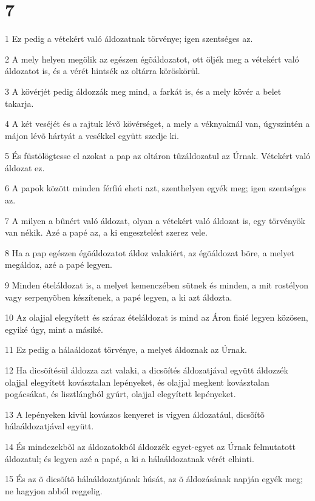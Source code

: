 \chapter{7}

\par 1 Ez pedig a vétekért való áldozatnak törvénye; igen szentséges az.
\par 2 A mely helyen megölik az egészen égõáldozatot, ott öljék meg a vétekért való áldozatot is, és a vérét hintsék az oltárra köröskörül.
\par 3 A kövérjét pedig áldozzák meg mind, a farkát is, és a mely kövér a belet takarja.
\par 4 A két veséjét és a rajtuk lévõ kövérséget, a mely a véknyaknál van, úgyszintén a májon lévõ hártyát a vesékkel együtt szedje ki.
\par 5 És füstölögtesse el azokat a pap az oltáron tûzáldozatul az Úrnak. Vétekért való áldozat ez.
\par 6 A papok között minden férfiú eheti azt, szenthelyen egyék meg; igen szentséges az.
\par 7 A milyen a bûnért való áldozat, olyan a vétekért való áldozat is, egy törvényök van nékik. Azé a papé az, a ki engesztelést szerez vele.
\par 8 Ha a pap egészen égõáldozatot áldoz valakiért, az égõáldozat bõre, a melyet megáldoz, azé a papé legyen.
\par 9 Minden ételáldozat is, a melyet kemenczében sütnek és minden, a mit rostélyon vagy serpenyõben készítenek, a papé legyen, a ki azt áldozta.
\par 10 Az olajjal elegyített és száraz ételáldozat is mind az Áron fiaié legyen közösen, egyiké úgy, mint a másiké.
\par 11 Ez pedig a hálaáldozat törvénye, a melyet áldoznak az Úrnak.
\par 12 Ha dicsõítésül áldozza azt valaki, a dicsõítés áldozatjával együtt áldozzék olajjal elegyített kovásztalan lepényeket, és olajjal megkent kovásztalan pogácsákat, és lisztlángból gyúrt, olajjal elegyített lepényeket.
\par 13 A lepényeken kivül kovászos kenyeret is vigyen áldozatául, dicsõítõ hálaáldozatjával együtt.
\par 14 És mindezekbõl az áldozatokból áldozzék egyet-egyet az Úrnak felmutatott áldozatul; és legyen azé a papé, a ki a hálaáldozatnak vérét elhinti.
\par 15 És az õ dicsõítõ hálaáldozatjának húsát, az õ áldozásának napján egyék meg; ne hagyjon abból reggelig.
